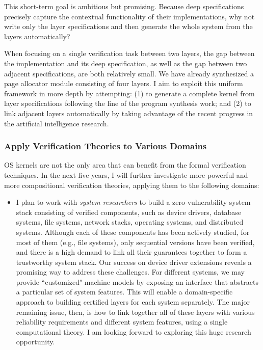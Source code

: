 \documentclass[a4paper, 10pt]{article}
\begin{document}
\begin{small}
This short-term goal is ambitious but promising.
Because deep specifications
precisely capture the contextual functionality of their implementations, why not write only the layer specifications
and then generate the whole system from the layers automatically?
\begin{comment}
I plan to extend the CertiKOS
framework such that the layer specification can be smartly 
``compiled" into C programs that meet the specification
and the layers at different abstract level can be linked together in a mostly automated way.
\end{comment}
When focusing on a single verification task between two layers,
 the gap between the implementation and its deep specification, as  well as the gap between two adjacent specifications,
are both relatively small.  We have already synthesized
a page allocator module consisting of four layers. 
I aim to  exploit this uniform framework in more depth by attempting: (1) to generate a complete kernel
 from layer specifications
following the line of the program synthesis work;
and (2) to link adjacent layers automatically
by taking advantage of the recent progress in the
artificial intelligence research.

\subsubsection*{\small Apply Verification Theories to Various Domains}
OS kernels are not the only area that can benefit
from the formal verification techniques. In the next five years, I will further investigate more powerful and more compositional  verification theories,
applying them
to the following domains: 
\begin{itemize}
\item I plan to work with \emph{system researchers} to build a zero-vulnerability system stack consisting of verified components, such as device drivers,
database systems, file systems, network stacks, operating systems,
 and distributed systems.
 Although each of these components has been actively studied,
 for most of them  (e.g., file systems), only  sequential versions have been verified, and there is a high demand to 
link all their guarantees together
to form  a  trustworthy system stack. Our success on  device driver extensions
reveals a promising way to address these challenges.
For different systems, we may
provide ``customized" machine models
by exposing an  interface that abstracts  a particular set of system features.
This will enable a domain-specific approach to building certified layers for each system separately.
The major remaining issue, then, is how to link together all of these layers with various reliability requirements
and different system features, using a single computational theory.
I am looking forward to exploring this huge research opportunity.



\end{itemize}
\end{small}
\end{document}
